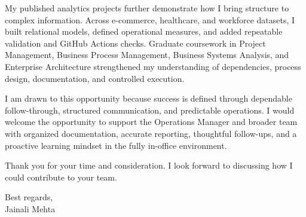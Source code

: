 \documentclass[letterpaper,11pt]{article}
\begin{document}
\bigbreak
My published analytics projects further demonstrate how I bring structure to complex information. Across e-commerce, healthcare, and workforce datasets, I built relational models, defined operational measures, and added repeatable validation and GitHub Actions checks. Graduate coursework in Project Management, Business Process Management, Business Systems Analysis, and Enterprise Architecture strengthened my understanding of dependencies, process design, documentation, and controlled execution.

\bigbreak
I am drawn to this opportunity because success is defined through dependable follow-through, structured communication, and predictable operations. I would welcome the opportunity to support the Operations Manager and broader team with organized documentation, accurate reporting, thoughtful follow-ups, and a proactive learning mindset in the fully in-office environment.

\bigbreak
Thank you for your time and consideration. I look forward to discussing how I could contribute to your team.

\bigbreak
Best regards,\\
Jainali Mehta
\end{document}
